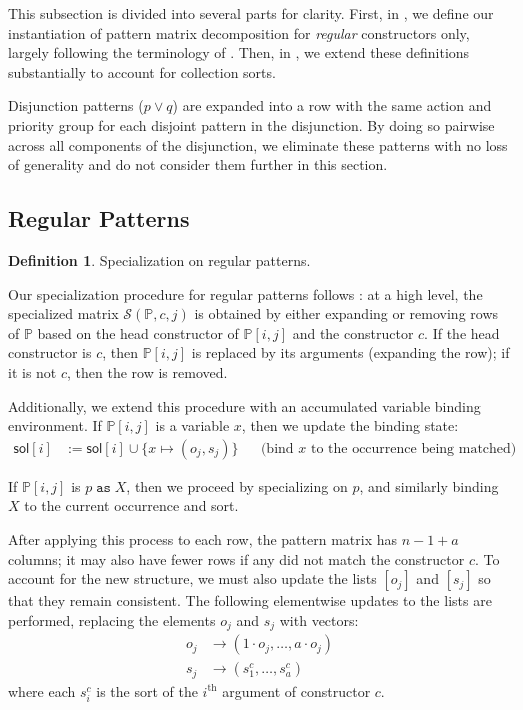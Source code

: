 \documentclass{article}
\theoremstyle{definition}
\newtheorem{definition}{Definition}[section]
\newcommand{\cS}{\mathcal{S}}
\newcommand{\sol}{\mathsf{sol}}
\newcommand{\PP}{\mathbb{P}}
\begin{document}
This subsection is divided into several parts for clarity. First, in
, we define our instantiation of pattern matrix
decomposition for \emph{regular} constructors only, largely following the
terminology of \citet{Maranget2008}. Then, in
, we extend these
definitions substantially to account for collection sorts.

Disjunction patterns ($p \lor q$) are expanded into a row with the same action
and priority group for each disjoint pattern in the disjunction. By doing so
pairwise across all components of the disjunction, we eliminate these
patterns with no loss of generality and do not consider them further in this
section.

\subsection{Regular Patterns} \label{sec:decomp:reg}


\begin{definition}{Specialization on regular patterns}.

Our specialization procedure for regular patterns follows \citet{Maranget2008}:
at a high level, the specialized matrix $ \cS(\PP, c, j) $ is obtained by either
expanding or removing rows of $ \PP $ based on the head constructor of $ \PP[i,
j] $ and the constructor $ c $. If the head constructor is $ c $, then $ \PP[i,
j] $ is replaced by its arguments (expanding the row); if it is not $ c $, then
the row is removed.

Additionally, we extend this procedure with an accumulated variable binding
environment. If $ \PP[i, j] $ is a variable $ x $, then we update the binding
state:
\begin{align*}
  \sol[i]   & := \sol[i] \cup \{x \mapsto (o_j, s_j) \}
    && \text{(bind $x$ to the occurrence being matched)}
\end{align*}

If $ \PP[i, j] $ is $ p \; \mathtt{as} \; X $, then we proceed by specializing on $
p $, and similarly binding $ X $ to the current occurrence and sort.








After applying this process to each row, the pattern matrix has $n-1+a$ columns;
it may also have fewer rows if any did not match the constructor $ c $. To
account for the new structure, we must also update the lists $ [o_j] $ and $
[s_j] $ so that they remain consistent. The following elementwise updates to the
lists are performed, replacing the elements $ o_j $ and $ s_j $ with vectors:
\begin{align*}
  o_j & \to (1 \cdot o_j, \dots, a \cdot o_j) \\
  s_j & \to (s^c_1, \dots, s^c_a)
\end{align*}
where each $ s^c_i $ is the sort of the $ i^{\text{th}} $ argument of
constructor $ c $.

\end{definition}
\end{document}
